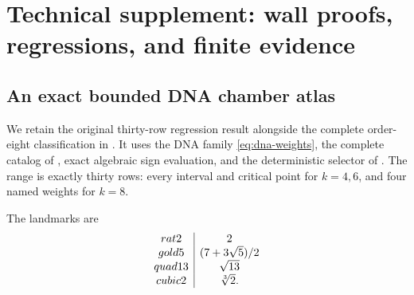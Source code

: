 \section{Technical supplement: wall proofs, regressions, and finite evidence}

\subsection{An exact bounded DNA chamber atlas}
\label{sec:finite-atlas}

We retain the original thirty-row regression result alongside the complete
order-eight classification in . It uses the DNA family
\eqref{eq:dna-weights}, the complete catalog of ,
exact algebraic sign evaluation, and the deterministic selector of
.  The range is exactly thirty rows: every
interval and critical point for $k=4,6$, and four named weights for $k=8$.

The landmarks are
\[
  \begin{array}{c|c}
  \role{rat2} & 2\\
  \role{gold5} & (7+3\sqrt5)/2\\
  \role{quad13} & \sqrt{13}\\
  \role{cubic2} & \sqrt[3]{2}.
  \end{array}
\]


